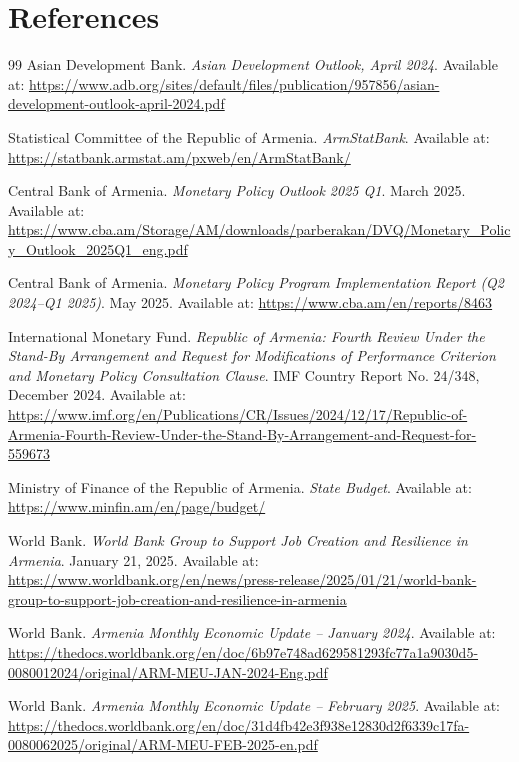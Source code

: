 \documentclass[12pt,a4paper]{report}
\begin{document}
\chapter*{References}
\begin{thebibliography}{99}
Asian Development Bank.
\textit{Asian Development Outlook, April 2024}.
Available at: \url{https://www.adb.org/sites/default/files/publication/957856/asian-development-outlook-april-2024.pdf}

Statistical Committee of the Republic of Armenia.
\textit{ArmStatBank}.
Available at: \url{https://statbank.armstat.am/pxweb/en/ArmStatBank/}

Central Bank of Armenia.
\textit{Monetary Policy Outlook 2025 Q1}.
March 2025.
Available at: \url{https://www.cba.am/Storage/AM/downloads/parberakan/DVQ/Monetary_Policy_Outlook_2025Q1_eng.pdf}

Central Bank of Armenia.
\textit{Monetary Policy Program Implementation Report (Q2 2024--Q1 2025)}.
May 2025.
Available at: \url{https://www.cba.am/en/reports/8463}

International Monetary Fund.
\textit{Republic of Armenia: Fourth Review Under the Stand-By Arrangement and Request for Modifications of Performance Criterion and Monetary Policy Consultation Clause}.
IMF Country Report No. 24/348, December 2024.
Available at: \url{https://www.imf.org/en/Publications/CR/Issues/2024/12/17/Republic-of-Armenia-Fourth-Review-Under-the-Stand-By-Arrangement-and-Request-for-559673}

Ministry of Finance of the Republic of Armenia.
\textit{State Budget}.
Available at: \url{https://www.minfin.am/en/page/budget/}

World Bank.
\textit{World Bank Group to Support Job Creation and Resilience in Armenia}.
January 21, 2025.
Available at: \url{https://www.worldbank.org/en/news/press-release/2025/01/21/world-bank-group-to-support-job-creation-and-resilience-in-armenia}

World Bank.
\textit{Armenia Monthly Economic Update -- January 2024}.
Available at: \url{https://thedocs.worldbank.org/en/doc/6b97e748ad629581293fc77a1a9030d5-0080012024/original/ARM-MEU-JAN-2024-Eng.pdf}

World Bank.
\textit{Armenia Monthly Economic Update -- February 2025}.
Available at: \url{https://thedocs.worldbank.org/en/doc/31d4fb42e3f938e12830d2f6339c17fa-0080062025/original/ARM-MEU-FEB-2025-en.pdf}


\end{thebibliography}
\end{document}
